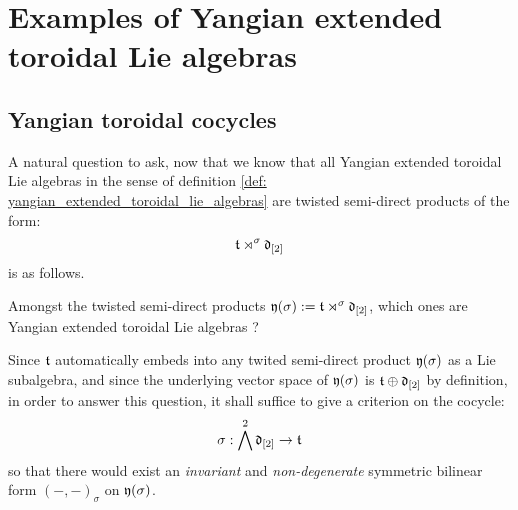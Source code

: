 \section{Examples of Yangian extended toroidal Lie algebras}
    \subsection{Yangian toroidal cocycles}
        A natural question to ask, now that we know that all Yangian extended toroidal Lie algebras in the sense of definition \ref{def: yangian_extended_toroidal_lie_algebras} are twisted semi-direct products of the form:
            $$\mathfrak{t} \rtimes^{\sigma} \mathfrak{d}_{[2]}$$
        is as follows.
        \begin{question}
            Amongst the twisted semi-direct products $\mathfrak{y}(\sigma) := \mathfrak{t} \rtimes^{\sigma} \mathfrak{d}_{[2]}$, which ones are Yangian extended toroidal Lie algebras ? 
        \end{question}
        Since $\mathfrak{t}$ automatically embeds into any twited semi-direct product $\mathfrak{y}(\sigma)$ as a Lie subalgebra, and since the underlying vector space of $\mathfrak{y}(\sigma)$ is $\mathfrak{t} \oplus \mathfrak{d}_{[2]}$ by definition, in order to answer this question, it shall suffice to give a criterion on the cocycle:
            $$\sigma: \bigwedge^2 \mathfrak{d}_{[2]} \to \mathfrak{t}$$
        so that there would exist an \textit{invariant} and \textit{non-degenerate} symmetric bilinear form $(-, -)_{\sigma}$ on $\mathfrak{y}(\sigma)$.

